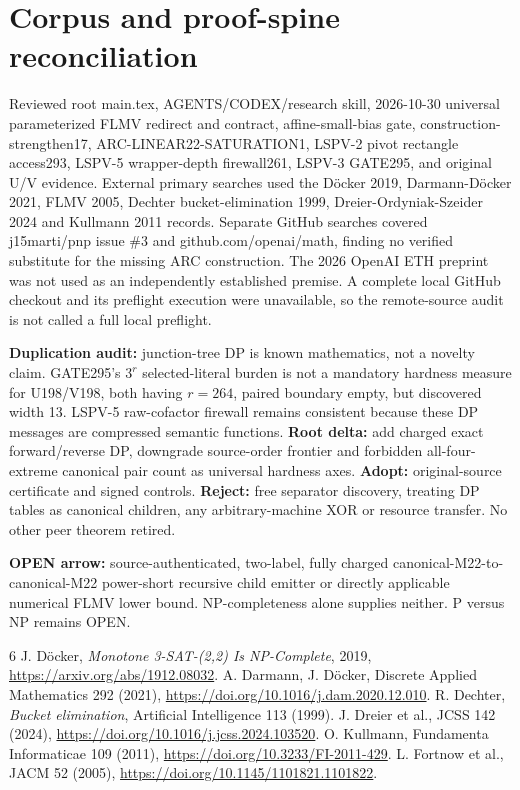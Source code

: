 \documentclass[11pt]{article}
\begin{document}
\section{Corpus and proof-spine reconciliation}
Reviewed root main.tex, AGENTS/CODEX/research skill, 2026-10-30 universal parameterized FLMV redirect and contract, affine-small-bias gate, construction-strengthen17, ARC-LINEAR22-SATURATION1, LSPV-2 pivot rectangle access293, LSPV-5 wrapper-depth firewall261, LSPV-3 GATE295, and original U/V evidence. External primary searches used the D\"ocker 2019, Darmann-D\"ocker 2021, FLMV 2005, Dechter bucket-elimination 1999, Dreier-Ordyniak-Szeider 2024 and Kullmann 2011 records. Separate GitHub searches covered j15marti/pnp issue \#3 and github.com/openai/math, finding no verified substitute for the missing ARC construction. The 2026 OpenAI ETH preprint was not used as an independently established premise. A complete local GitHub checkout and its preflight execution were unavailable, so the remote-source audit is not called a full local preflight.

\noindent\textbf{Duplication audit:} junction-tree DP is known mathematics, not a novelty claim. GATE295's $3^r$ selected-literal burden is not a mandatory hardness measure for U198/V198, both having $r=264$, paired boundary empty, but discovered width 13. LSPV-5 raw-cofactor firewall remains consistent because these DP messages are compressed semantic functions. \textbf{Root delta:} add charged exact forward/reverse DP, downgrade source-order frontier and forbidden all-four-extreme canonical pair count as universal hardness axes. \textbf{Adopt:} original-source certificate and signed controls. \textbf{Reject:} free separator discovery, treating DP tables as canonical children, any arbitrary-machine XOR or resource transfer. No other peer theorem retired.

\noindent\textbf{OPEN arrow:} source-authenticated, two-label, fully charged canonical-M22-to-canonical-M22 power-short recursive child emitter or directly applicable numerical FLMV lower bound. NP-completeness alone supplies neither. P versus NP remains OPEN.

\begin{thebibliography}{6}
 J. D\"ocker, \emph{Monotone 3-SAT-(2,2) Is NP-Complete}, 2019, \url{https://arxiv.org/abs/1912.08032}.
 A. Darmann, J. D\"ocker, Discrete Applied Mathematics 292 (2021), \url{https://doi.org/10.1016/j.dam.2020.12.010}.
 R. Dechter, \emph{Bucket elimination}, Artificial Intelligence 113 (1999).
 J. Dreier et al., JCSS 142 (2024), \url{https://doi.org/10.1016/j.jcss.2024.103520}.
 O. Kullmann, Fundamenta Informaticae 109 (2011), \url{https://doi.org/10.3233/FI-2011-429}.
 L. Fortnow et al., JACM 52 (2005), \url{https://doi.org/10.1145/1101821.1101822}.
\end{thebibliography}
\end{document}
